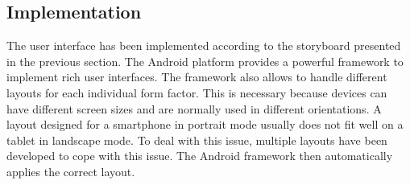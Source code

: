 \documentclass[numbers=noenddot, abstract=on, a4paper, headsepline,
footsepline, oneside, draft=off]{scrreprt}
\begin{document}
\subsection{Implementation}
The user interface has been implemented according to the storyboard presented in
the previous section. The Android platform provides a powerful framework to
implement rich user interfaces. The framework also allows to handle different
layouts for each individual form factor. This is necessary because devices can
have different screen sizes and are normally used in different orientations. A
layout designed for a smartphone in portrait mode usually does not fit well on a
tablet in landscape mode. To deal with this issue, multiple layouts have been
developed to cope with this issue. The Android framework then automatically
applies the correct layout.
\end{document}
